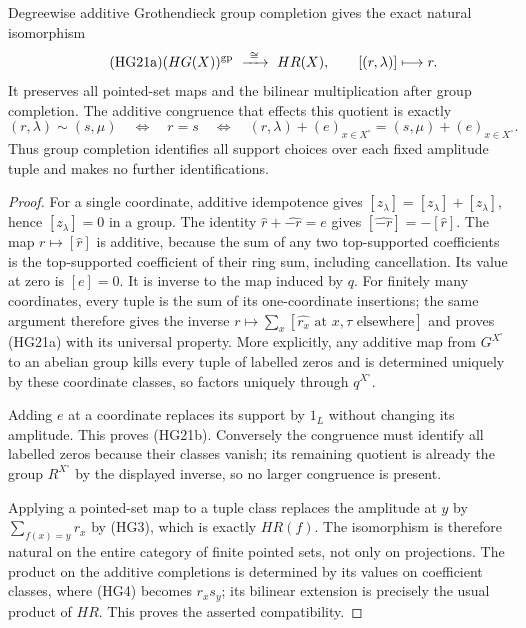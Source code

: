 \begin{proposition}\label{HG:completion}
Degreewise additive Grothendieck group completion gives the exact
natural isomorphism
\begin{equation}\tag{HG21a}
 (HG(X))^{\rm gp}\ \xrightarrow{\ \cong\ }\ HR(X),
 \qquad [(r,\lambda)]\longmapsto r.
\end{equation}
It preserves all pointed-set maps and the bilinear multiplication
after group completion.  The additive congruence that effects this
quotient is exactly
\begin{equation}\tag{HG21b}
 (r,\lambda)\sim(s,\mu)
 \quad\Longleftrightarrow\quad r=s
 \quad\Longleftrightarrow\quad
 (r,\lambda)+(e)_{x\in X^\circ}
  =(s,\mu)+(e)_{x\in X^\circ}.
\end{equation}
Thus group completion identifies all support choices over each
fixed amplitude tuple and makes no further identifications.
\end{proposition}
\begin{proof}
For a single coordinate, additive idempotence gives
$[z_\lambda]=[z_\lambda]+[z_\lambda]$, hence
$[z_\lambda]=0$ in a group.  The identity
$\widehat r+\widehat{-r}=e$ gives
$[\widehat{-r}]=-[\widehat r]$.  The map
$r\mapsto[\widehat r]$ is additive, because the sum of any
two top-supported coefficients is the top-supported coefficient
of their ring sum, including cancellation.  Its value at zero
is $[e]=0$.  It is inverse to the map induced by $q$.
For finitely many coordinates, every tuple is the sum of its
one-coordinate insertions; the same argument therefore gives
the inverse $r\mapsto\sum_x[\widehat{r_x}\text{ at }x,
\tau\text{ elsewhere}]$ and proves (HG21a) with its universal
property.  More explicitly, any additive map from $G^{X^\circ}$
to an abelian group kills every tuple of labelled zeros and is
determined uniquely by these coordinate classes, so factors
uniquely through $q^{X^\circ}$.

Adding $e$ at a coordinate replaces its support by $1_L$
without changing its amplitude.  This proves (HG21b).
Conversely the congruence must identify all labelled zeros
because their classes vanish; its remaining quotient is
already the group $R^{X^\circ}$ by the displayed inverse,
so no larger congruence is present.

Applying a pointed-set map to a tuple class replaces the
amplitude at $y$ by $\sum_{f(x)=y}r_x$ by (HG3), which is
exactly $HR(f)$.  The isomorphism is therefore natural on
the entire category of finite pointed sets, not only on
projections.  The product on the additive completions is
determined by its values on coefficient classes, where (HG4)
becomes $r_xs_y$; its bilinear extension is precisely the
usual product of $HR$.  This proves the asserted compatibility.
\end{proof}

